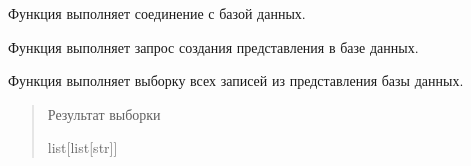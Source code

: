 \documentclass[letterpaper,10pt,russian]{sphinxmanual}
\begin{document}
\begin{fulllineitems}
\begin{fulllineitems}
\end{fulllineitems}


\begin{fulllineitems}
\label{\detokenize{database.sqlite3_interface.views:database.sqlite3_interface.views.view.View.connect_db}}
\pysigstartsignatures
{}
\pysigstopsignatures
\sphinxAtStartPar
Функция выполняет соединение с базой данных.

\end{fulllineitems}


\begin{fulllineitems}
\label{\detokenize{database.sqlite3_interface.views:database.sqlite3_interface.views.view.View.create}}
\pysigstartsignatures
{}
\pysigstopsignatures
\sphinxAtStartPar
Функция выполняет запрос создания представления в базе данных.

\end{fulllineitems}


\begin{fulllineitems}
\label{\detokenize{database.sqlite3_interface.views:database.sqlite3_interface.views.view.View.select_all}}
\pysigstartsignatures
{}
\pysigstopsignatures
\sphinxAtStartPar
Функция выполняет выборку всех записей из представления базы данных.
\begin{quote}\begin{description}
\sphinxAtStartPar
Результат выборки

\sphinxAtStartPar
list{[}list{[}str{]}{]}

\end{description}\end{quote}

\end{fulllineitems}


\end{fulllineitems}
\end{document}
